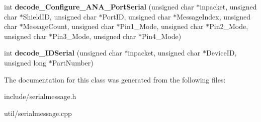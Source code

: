 \begin{DoxyCompactItemize}
\item 
\mbox{\label{classSerialMessageHandler_a897038abd548f29dea408fd205f535a0}} 
int {\bfseries decode\+\_\+\+Configure\+\_\+\+A\+N\+A\+\_\+\+Port\+Serial} (unsigned char $\ast$inpacket, unsigned char $\ast$Shield\+ID, unsigned char $\ast$Port\+ID, unsigned char $\ast$Message\+Index, unsigned char $\ast$Message\+Count, unsigned char $\ast$Pin1\+\_\+\+Mode, unsigned char $\ast$Pin2\+\_\+\+Mode, unsigned char $\ast$Pin3\+\_\+\+Mode, unsigned char $\ast$Pin4\+\_\+\+Mode)
\item 
\mbox{\label{classSerialMessageHandler_a2406c3e75a5f79e83690920369049409}} 
int {\bfseries decode\+\_\+\+I\+D\+Serial} (unsigned char $\ast$inpacket, unsigned char $\ast$Device\+ID, unsigned long $\ast$Part\+Number)
\end{DoxyCompactItemize}


The documentation for this class was generated from the following files\+:\begin{DoxyCompactItemize}
\item 
include/serialmessage.\+h\item 
util/serialmessage.\+cpp\end{DoxyCompactItemize}
